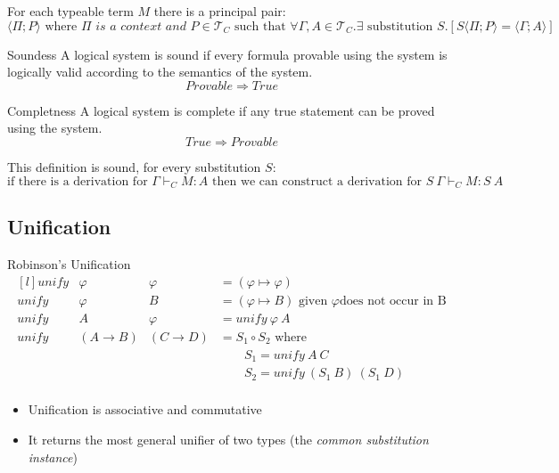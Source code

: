 For each typeable term $M$ there is a principal pair:
\[\langle \Pi ; P \rangle \text{ where } \Pi \textit{ is a context and } P \in \mathcal{T}_C \text{ such that } \forall \Gamma, A \in \mathcal{T}_C . \exists \text{ substitution }S . [S \langle \Pi ; P \rangle = \langle \Gamma; A \rangle]\]

\begin{tcbraster}[raster columns=2,raster equal height]
    \begin{definitionbox}{Soundess}
        A logical system is sound if every formula provable using the system is logically valid according to the semantics of the system.
        \[Provable \Rightarrow True\]
    \end{definitionbox}
    \begin{definitionbox}{Completness}
        A logical system is complete if any true statement can be proved using the system.
        \[True \Rightarrow Provable\]
    \end{definitionbox}
\end{tcbraster}

This definition is sound, for every substitution $S$:
\[\text{if there is a derivation for } \Gamma \vdash_C M : A \text{ then we can  construct a derivation for } S \ \Gamma \vdash_C M : S \ A\]


\subsection{Unification}

\begin{definitionbox}{Robinson's Unification}
    \[\begin{matrix*}[l]
        unify & \varphi & \varphi & = (\varphi \mapsto \varphi) \\
        unify & \varphi & B & = (\varphi \mapsto B)  \text{ given } \varphi \text{does not occur in B} \\
        unify & A & \varphi & = unify \ \varphi \ A \\
        unify &(A \to B) & (C \to D) & = S_1 \circ S_2 \text{ where} \\
        & & & \qquad S_1 = unify \ A \ C \\
        & & & \qquad S_2 = unify \ (S_1 \ B) \ (S_1 \ D)\\
    \end{matrix*}\]
    \begin{itemize}
        \item Unification is associative and commutative
        \item It returns the most general unifier of two types (the \textit{common substitution instance})
    \end{itemize}
\end{definitionbox}

